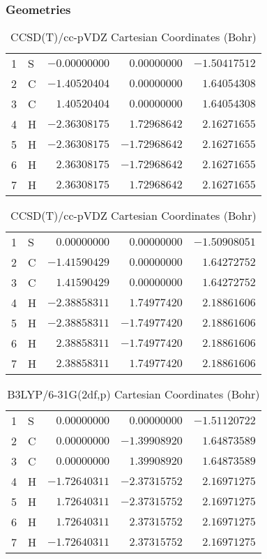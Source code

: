 \documentclass[10pt,oneside]{article}
\begin{document}
\begin{table}[h!]
\subsubsection*{Geometries}
\begin{multicols}{2}
\centering
\caption{CCSD(T)/cc-pVTZ Cartesian Coordinates (Bohr)}
\begin{tabular}{llrrr}
\toprule
1  & S  & $-0.00000000$ & $ 0.00000000$ & $-1.50417512$ \\
2  & C  & $-1.40520404$ & $ 0.00000000$ & $ 1.64054308$ \\
3  & C  & $ 1.40520404$ & $ 0.00000000$ & $ 1.64054308$ \\
4  & H  & $-2.36308175$ & $ 1.72968642$ & $ 2.16271655$ \\
5  & H  & $-2.36308175$ & $-1.72968642$ & $ 2.16271655$ \\
6  & H  & $ 2.36308175$ & $-1.72968642$ & $ 2.16271655$ \\
7  & H  & $ 2.36308175$ & $ 1.72968642$ & $ 2.16271655$ \\
\bottomrule
\end{tabular}
\caption{CCSD(T)/cc-pVDZ Cartesian Coordinates (Bohr)}
\begin{tabular}{llrrr}
\toprule
1  & S  & $ 0.00000000$ & $ 0.00000000$ & $-1.50908051$ \\
2  & C  & $-1.41590429$ & $ 0.00000000$ & $ 1.64272752$ \\
3  & C  & $ 1.41590429$ & $ 0.00000000$ & $ 1.64272752$ \\
4  & H  & $-2.38858311$ & $ 1.74977420$ & $ 2.18861606$ \\
5  & H  & $-2.38858311$ & $-1.74977420$ & $ 2.18861606$ \\
6  & H  & $ 2.38858311$ & $-1.74977420$ & $ 2.18861606$ \\
7  & H  & $ 2.38858311$ & $ 1.74977420$ & $ 2.18861606$ \\
\bottomrule
\end{tabular}
\end{multicols}
\end{table}

\begin{table}[h]
\centering
\caption{B3LYP/6-31G(2df,p) Cartesian Coordinates (Bohr)}
\begin{tabular}{llrrr}
\toprule
1  & S  & $ 0.00000000$ & $ 0.00000000$ & $-1.51120722$ \\
2  & C  & $ 0.00000000$ & $-1.39908920$ & $ 1.64873589$ \\
3  & C  & $ 0.00000000$ & $ 1.39908920$ & $ 1.64873589$ \\
4  & H  & $-1.72640311$ & $-2.37315752$ & $ 2.16971275$ \\
5  & H  & $ 1.72640311$ & $-2.37315752$ & $ 2.16971275$ \\
6  & H  & $ 1.72640311$ & $ 2.37315752$ & $ 2.16971275$ \\
7  & H  & $-1.72640311$ & $ 2.37315752$ & $ 2.16971275$ \\
\bottomrule
\end{tabular}
\end{table}
\end{document}
